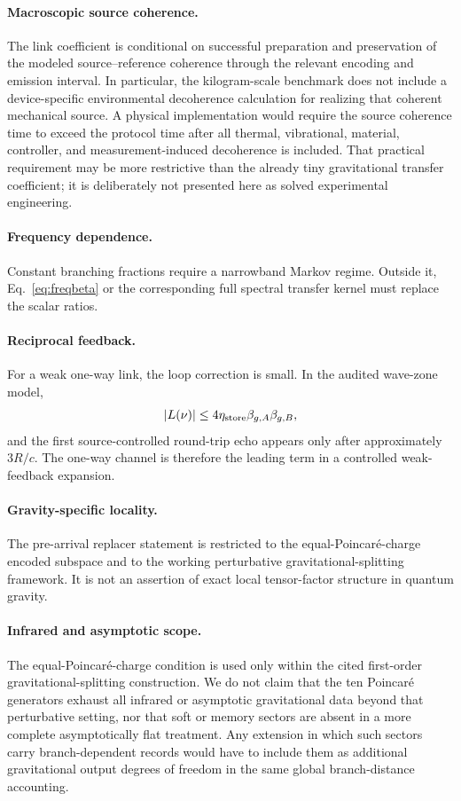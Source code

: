 \paragraph{Macroscopic source coherence.}
The link coefficient is conditional on successful preparation and preservation of the modeled source--reference coherence through the relevant encoding and emission interval. In particular, the kilogram-scale benchmark does not include a device-specific environmental decoherence calculation for realizing that coherent mechanical source. A physical implementation would require the source coherence time to exceed the protocol time after all thermal, vibrational, material, controller, and measurement-induced decoherence is included. That practical requirement may be more restrictive than the already tiny gravitational transfer coefficient; it is deliberately not presented here as solved experimental engineering.

\paragraph{Frequency dependence.}
Constant branching fractions require a narrowband Markov regime. Outside it, Eq.~\eqref{eq:freqbeta} or the corresponding full spectral transfer kernel must replace the scalar ratios.

\paragraph{Reciprocal feedback.}
For a weak one-way link, the loop correction is small. In the audited wave-zone model,
\begin{equation}
|L(\nu)|\le4\eta_{\rm store}\beta_{g,A}\beta_{g,B},
\end{equation}
and the first source-controlled round-trip echo appears only after approximately $3R/c$. The one-way channel is therefore the leading term in a controlled weak-feedback expansion.

\paragraph{Gravity-specific locality.}
The pre-arrival replacer statement is restricted to the equal-Poincar\'e-charge encoded subspace and to the working perturbative gravitational-splitting framework. It is not an assertion of exact local tensor-factor structure in quantum gravity.

\paragraph{Infrared and asymptotic scope.}
The equal-Poincar\'e-charge condition is used only within the cited first-order gravitational-splitting construction. We do not claim that the ten Poincar\'e generators exhaust all infrared or asymptotic gravitational data beyond that perturbative setting, nor that soft or memory sectors are absent in a more complete asymptotically flat treatment. Any extension in which such sectors carry branch-dependent records would have to include them as additional gravitational output degrees of freedom in the same global branch-distance accounting.

